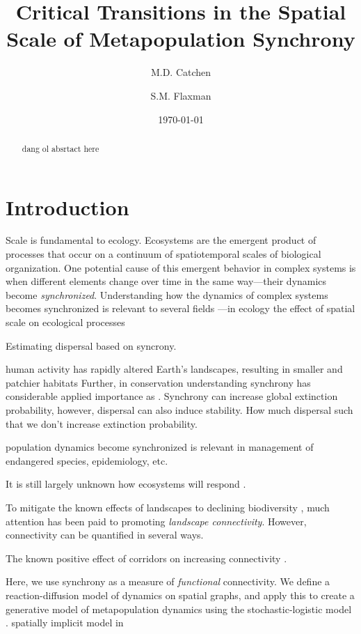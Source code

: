 \documentclass[]{article}
\title{Critical Transitions in the Spatial Scale of Metapopulation Synchrony \\}
\author[1,2]{M.D. Catchen}
\author[1]{S.M. Flaxman}
\affil[1]{\small{Department of Ecology and Evolutionary Biology, University of Colorado at Boulder}}
\affil[2]{\small{Department of Biology, McGill University}}
\date{\today}
\begin{document}
\maketitle
\begin{abstract}

dang ol absrtact here

\end{abstract}
\clearpage
\tableofcontents
\clearpage
\section{Introduction}

Scale is fundamental to ecology. 
Ecosystems are the emergent product of processes that occur on a continuum of spatiotemporal scales of biological organization.
One potential cause of this emergent behavior in complex systems is when different elements change over time in the same way---their dynamics become \textit{synchronized}. 
Understanding how the dynamics of complex systems becomes synchronized is relevant to several fields \cite{}---in ecology the effect of spatial scale on ecological processes


Estimating dispersal based on syncrony.

human activity has rapidly altered Earth's landscapes, resulting in smaller and patchier habitats
Further, in conservation understanding synchrony has considerable applied importance as .
Synchrony can increase global extinction probability, however, dispersal can also induce stability.
How much dispersal such that we don't increase extinction probability. 


population dynamics become synchronized is relevant in management of endangered species, epidemiology, etc.



It is still largely unknown how ecosystems will respond .

To mitigate the known effects of landscapes to declining biodiversity \cite{}, much attention has been paid to promoting \textit{landscape connectivity}. However, connectivity can be quantified in several ways.

The known positive effect of corridors on increasing connectivity \cite{resasco_2017}.

Here, we use synchrony as a measure of \textit{functional} connectivity. We define a reaction-diffusion model of dynamics on spatial graphs, and apply this to create a generative model of metapopulation dynamics using the stochastic-logistic model \cite{}.   
spatially implicit model in \cite{wang2015}
\end{document}
